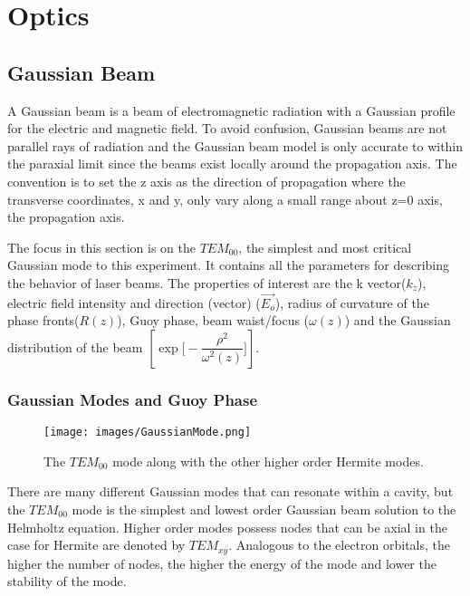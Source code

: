\documentclass[11pt,a4paper]{book}
\begin{document}
\chapter{Optics}

	\section{Gaussian Beam}
		\label{sec:Gaussian Beam}
		A Gaussian beam is a beam of electromagnetic radiation with a Gaussian profile for the electric and magnetic field. 
		To avoid confusion, Gaussian beams are not parallel rays of radiation and the Gaussian beam model is only accurate to within the paraxial limit since the beams exist locally around the propagation axis.
		The convention is to set the z axis as the direction of propagation where the transverse coordinates, x and y, only vary along a small range about z=0 axis, the propagation axis.
		
		The focus in this section is on the $TEM_{00}$, the simplest and most critical Gaussian mode to this experiment. It contains all the parameters for describing the behavior of laser beams. The properties of interest are the k vector($k_z$), electric field intensity and direction (vector) ($\vec{E_o}$), radius of curvature of the phase fronts($R(z)$), Guoy phase, beam waist/focus ($\omega(z)$) and the Gaussian distribution of the beam $\left[ \exp{\bigg[-\dfrac{\rho^2}{\omega^2(z)}\bigg]}\right]$.
		\subsection{Gaussian Modes and Guoy Phase}
			\label{subsec:Gaussian Modes and Guoy Phase}
			
			\begin{figure} 
				\centering
				\texttt{[image: images/GaussianMode.png]}
				\caption{\cite{hermite} \cite{Laguerre} The $TEM_{00}$ mode along with the other higher order Hermite modes.}
				\label{fig:Hermite-gaussian}	
			\end{figure}
			
			There are many different Gaussian modes that can resonate within a cavity, but the $TEM_{00}$ mode is the simplest and lowest order Gaussian beam solution to the Helmholtz equation. 
			Higher order modes possess nodes that can be axial in the case for Hermite are denoted by $TEM_{xy}$. Analogous to the electron orbitals, the higher the number of nodes, the higher the energy of the mode and lower the stability of the mode.
			
\end{document}
